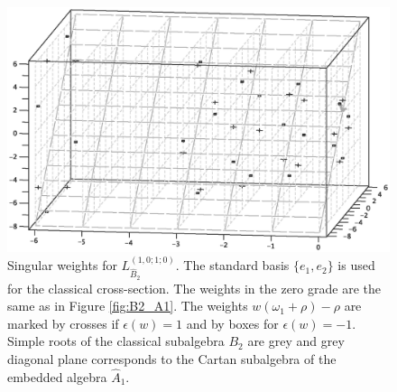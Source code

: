 \documentclass[12pt]{iopart}
\theoremstyle{definition}
\begin{document}
\begin{figure}[h!tb]
  \includegraphics[width=140mm]{figure11.eps}
  \caption{Singular weights for $L^{(1,0;1;0)}_{\hat B_2 }$. The standard basis $\{e_1,e_2\}$ is used for the classical cross-section.
  The weights in the zero grade are the same as in Figure \ref{fig:B2_A1}.
  The weights $w (\omega_1+\rho)-\rho$ are marked by crosses if $\epsilon(w)=1$ and by boxes for $\epsilon(w)=-1$.
Simple roots of the classical subalgebra $B_2$ are grey and grey diagonal plane corresponds to the Cartan subalgebra
of the embedded algebra $\hat{A}_1$.}
  \label{fig:affine_B2_anom_point}
\end{figure}
\end{document}

